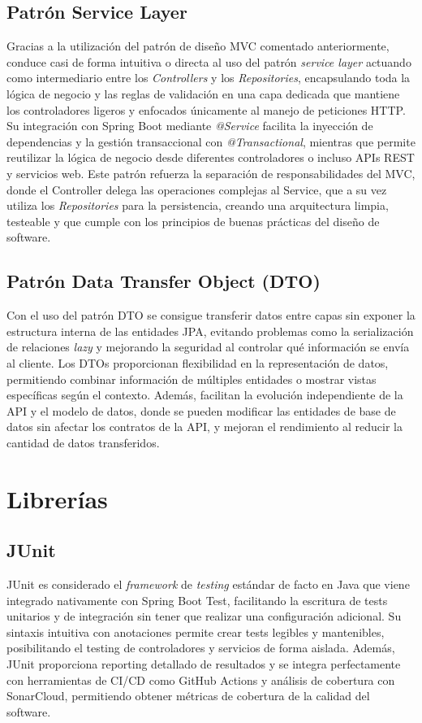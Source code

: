 \subsection{Patrón Service Layer}\label{patron-service-layer}
Gracias a la utilización del patrón de diseño MVC comentado anteriormente, conduce casi de forma intuitiva o directa al uso del patrón \emph{service layer} actuando como intermediario entre los \emph{Controllers} y los \emph{Repositories}, encapsulando toda la lógica de negocio y las reglas de validación en una capa dedicada que mantiene los controladores ligeros y enfocados únicamente al manejo de peticiones HTTP. Su integración con Spring Boot mediante \emph{@Service} facilita la inyección de dependencias y la gestión transaccional con \emph{@Transactional}, mientras que permite reutilizar la lógica de negocio desde diferentes controladores o incluso APIs REST y servicios web. Este patrón refuerza la separación de responsabilidades del MVC, donde el Controller delega las operaciones complejas al Service, que a su vez utiliza los \emph{Repositories} para la persistencia, creando una arquitectura limpia, testeable y que cumple con los principios de buenas prácticas del diseño de software.

\subsection{Patrón Data Transfer Object (DTO)}\label{patron-data-transfer-object}
Con el uso del patrón DTO se consigue transferir datos entre capas sin exponer la estructura interna de las entidades JPA, evitando problemas como la serialización de relaciones \emph{lazy} y mejorando la seguridad al controlar qué información se envía al cliente. Los DTOs proporcionan flexibilidad en la representación de datos, permitiendo combinar información de múltiples entidades o mostrar vistas específicas según el contexto. Además, facilitan la evolución independiente de la API y el modelo de datos, donde se pueden modificar las entidades de base de datos sin afectar los contratos de la API, y mejoran el rendimiento al reducir la cantidad de datos transferidos.

\section{Librerías}\label{librerias}

\subsection{JUnit}\label{junit}
JUnit es considerado el \emph{framework} de \emph{testing} estándar de facto en Java que viene integrado nativamente con Spring Boot Test, facilitando la escritura de tests unitarios y de integración sin tener que realizar una configuración adicional. Su sintaxis intuitiva con anotaciones permite crear tests legibles y mantenibles, posibilitando el testing de controladores y servicios de forma aislada. Además, JUnit proporciona reporting detallado de resultados y se integra perfectamente con herramientas de CI/CD como GitHub Actions y análisis de cobertura con SonarCloud, permitiendo obtener métricas de cobertura de la calidad del software.

